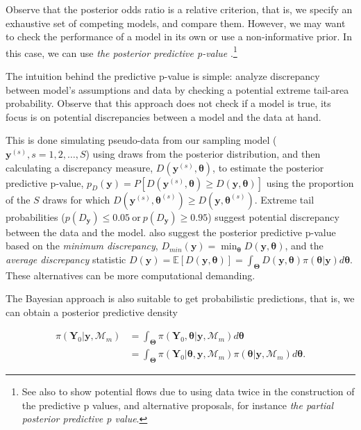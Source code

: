 Observe that the posterior odds ratio is a relative criterion, that is, we specify an exhaustive set of competing models, and compare them. However, we may want to check the performance of a model in its own or use a non-informative prior. In this case, we can use \textit{the posterior predictive p-value} \cite{Gelman1996,gelman1996posterior}.\footnote{See also \cite{Bayarri2000} to show potential flows due to using data twice in the construction of the predictive p values, and alternative proposals, for instance \textit{the partial posterior predictive p value}.}

The intuition behind the predictive p-value is simple: analyze discrepancy between model's assumptions and data by checking a potential extreme tail-area probability. Observe that this approach does not check if a model is true, its focus is on potential discrepancies between a model and the data at hand. 

This is done simulating pseudo-data from our sampling model ($\mathbf{y}^{(s)}, s=1,2,\dots,S$) using draws from the posterior distribution, and then calculating a discrepancy measure, $D(\mathbf{y}^{(s)},\mathbf{\theta})$, to estimate the posterior predictive p-value, $p_D(\mathbf{y})=P[D(\mathbf{y}^{(s)},\mathbf{\theta})\geq D(\mathbf{y},\mathbf{\theta})]$ using the proportion of the $S$ draws for which $D(\mathbf{y}^{(s)},\mathbf{\theta}^{(s)})\geq D(\mathbf{y},\mathbf{\theta}^{(s)})$. Extreme tail probabilities ($p(D_{\mathbf{y}}) \leq 0.05  \ \text{or} \ p(D_{\mathbf{y}}) \geq 0.95$) suggest potential discrepancy between the data and the model. \cite{gelman1996posterior} also suggest the posterior predictive p-value based on the \textit{minimum discrepancy}, $D_{min}(\mathbf{y})=\min_{\mathbf{\theta}}D(\mathbf{y},\mathbf{\theta})$, and the \textit{average discrepancy} statistic $D(\mathbf{y})=\mathbb{E}[D(\mathbf{y},\mathbf{\theta})]=\int_{\mathbf{\Theta}}D(\mathbf{y},\mathbf{\theta})\pi(\mathbf{\theta|\mathbf{y}})d\mathbf{\theta}$. These alternatives can be more computational demanding.

The Bayesian approach is also suitable to get probabilistic predictions, that is, we can obtain a posterior predictive density 

\begin{align}
	\pi(\mathbf{Y}_0|\mathbf{y},\mathcal{M}_m) & =\int_{\mathbf{\Theta}}\pi(\mathbf{Y}_0,\mathbf{\theta}|\mathbf{y},\mathcal{M}_m)d\mathbf{\theta}\nonumber\\
	&=\int_{\mathbf{\Theta}}\pi(\mathbf{Y}_0|\mathbf{\theta},\mathbf{y},\mathcal{M}_m)\pi(\mathbf{\theta}|\mathbf{y},\mathcal{M}_m)d\mathbf{\theta}.
	\label{eq:126}
\end{align}

